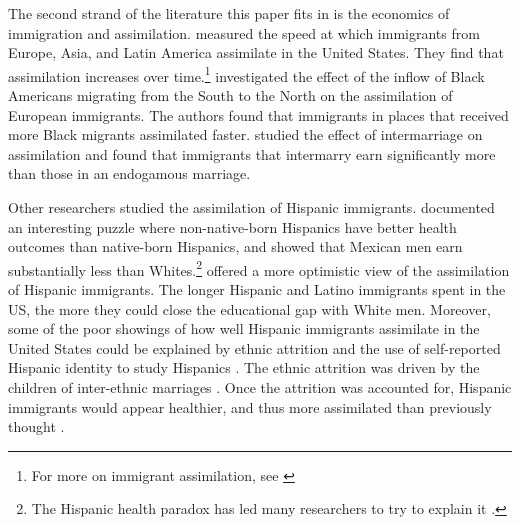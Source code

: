 \documentclass[12pt, fullpage]{article}
\begin{document}
The second strand of the literature this paper fits in is the economics of immigration and assimilation. \citet{abramitzkyCulturalAssimilationAge2016} measured the speed at which immigrants from Europe, Asia, and Latin America assimilate in the United States. They find that assimilation increases over time.\footnote{For more on immigrant assimilation, see \citet{abramitzkyLeavingEnclaveHistorical2020,abramitzkyIntergenerationalMobilityImmigrants2019,abramitzkyDiscriminationReturnsCultural2020,abramitzkyNationImmigrantsAssimilation2014}} \citet{foukaImmigrantsAmericansRace2022} investigated the effect of the inflow of Black Americans migrating from the South to the North on the assimilation of European immigrants. The authors found that immigrants in places that received more Black migrants assimilated faster.  \citet{mengIntermarriageEconomicAssimilation2005} studied the effect of intermarriage on assimilation and found that immigrants that intermarry earn significantly more than those in an endogamous marriage.

Other researchers studied the assimilation of Hispanic immigrants. \citet{antecolUnhealthyAssimilationWhy2006} documented an interesting puzzle where non-native-born Hispanics have better health outcomes than native-born Hispanics, and \citet{trejoWhyMexicanAmericans1997} showed that Mexican men earn substantially less than Whites.\footnote{The Hispanic health paradox has led many researchers to try to explain it \citep{giuntellaAssimilationHealthEvidence2016,giuntellaAccelerationImmigrantUnhealthy2017,giuntellaReasonImmigrationImmigrants2018,giuntellaWhyDoesHealth2017a,antmanEthnicAttritionObserved2016,antmanEthnicAttritionAssimilation2020}.} \citet{smithAssimilationLatinoGenerations2003} offered a more optimistic view of the assimilation of Hispanic immigrants. The longer Hispanic and Latino immigrants spent in the US, the more they could close the educational gap with White men. Moreover, some of the poor showings of how well Hispanic immigrants assimilate in the United States could be explained by ethnic attrition and the use of self-reported Hispanic identity to study Hispanics \citep{duncanComplexityImmigrantGenerations2017,duncanWhoRemainsMexican2011,mengIntermarriageEconomicAssimilation2005,duncanIdentifyingLaterGenerationDescendants2018,duncanSocioeconomicIntegrationImmigrant2018,antmanEthnicAttritionObserved2016,antmanEthnicAttritionAssimilation2020}. The ethnic attrition was driven by the children of inter-ethnic marriages \citep{mengIntermarriageEconomicAssimilation2005,duncanEthnicIdentificationIntermarriage2005}. Once the attrition was accounted for, Hispanic immigrants would appear healthier, and thus more assimilated than previously thought \citep{antmanEthnicAttritionObserved2016,antmanEthnicAttritionAssimilation2020}. 
\end{document}
